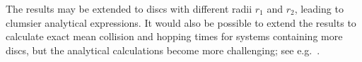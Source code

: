 \documentclass[superscriptaddress,pre,reprint,showpacs,twocolumn]{revtex4-1}
\begin{document}
The results may be extended to discs with different radii
$r_1$ and $r_2$, leading to clumsier analytical expressions.
It would also be possible to extend the results to calculate exact mean collision
and hopping times for systems containing more discs,
but the analytical calculations become more challenging; see e.g.~\cite{three_hard_discs_2004}.


\end{document}
